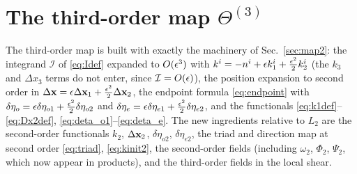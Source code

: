 \section{The third-order map \texorpdfstring{$\Theta^{(3)}$}{Theta3}}
\label{sec:map3}
The third-order map is built with exactly the machinery of Sec.~\ref{sec:map2}: the integrand $\mathcal I$ of \eqref{eq:Idef}
expanded to $O(\epsilon^3)$ with $k^i=-n^i+\epsilon k_1^i+\tfrac{\epsilon^2}2k_2^i$ (the $k_3$ and $\Delta x_3$ terms do not enter, since
$\mathcal I=O(\epsilon)$), the position expansion to second order in $\Delta\mathbf x=\epsilon\Delta\mathbf x_1+\tfrac{\epsilon^2}2\Delta\mathbf x_2$, the endpoint formula
\eqref{eq:endpoint} with $\delta\eta_o=\epsilon\delta\eta_{o1}+\tfrac{\epsilon^2}2\delta\eta_{o2}$ and $\delta\eta_e=\epsilon\delta\eta_{e1}+\tfrac{\epsilon^2}2\delta\eta_{e2}$,
and the functionals \eqref{eq:k1def}--\eqref{eq:Dx2def}, \eqref{eq:deta_o1}--\eqref{eq:deta_e}.  The new ingredients relative to $L_2$
are the second-order functionals $k_2$, $\Delta\mathbf x_2$, $\delta\eta_{o2}$, $\delta\eta_{e2}$, the triad and direction map at second order
\eqref{eq:triad}, \eqref{eq:kinit2}, the second-order fields (including $\omega_2$, $\Phi_2$, $\Psi_2$, which now appear in products), and the
third-order fields in the local shear.

